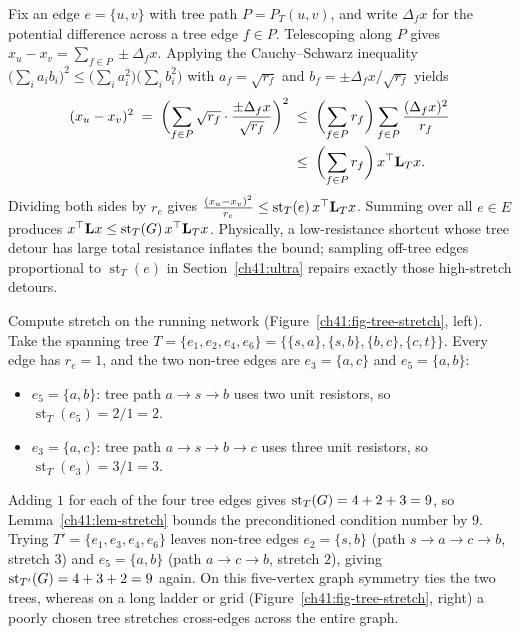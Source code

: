 \begin{whybox}
Fix an edge $e=\{u,v\}$ with tree path $P=P_T(u,v)$, and write $\Delta_f x$ for the potential difference across a tree edge $f \in P$. Telescoping along $P$ gives $x_u - x_v = \sum_{f \in P} \pm \Delta_f x$. Applying the Cauchy--Schwarz inequality $\bigl(\sum_i a_i b_i\bigr)^2 \le \bigl(\sum_i a_i^2\bigr)\bigl(\sum_i b_i^2\bigr)$ with $a_f = \sqrt{r_f}$ and $b_f = \pm \Delta_f x / \sqrt{r_f}$ yields
\begin{align*}
  (x_u-x_v)^2 \;=\; \biggl(\sum_{f\in P}\sqrt{r_f}\cdot\frac{\pm\Delta_f x}{\sqrt{r_f}}\biggr)^2
  &\;\le\; \biggl(\sum_{f\in P}r_f\biggr)\sum_{f\in P}\frac{(\Delta_f x)^2}{r_f} \\
  &\;\le\; \biggl(\sum_{f\in P}r_f\biggr)\,x^\top\mathbf{L}_T x .
\end{align*}
Dividing both sides by $r_e$ gives $\frac{(x_u-x_v)^2}{r_e}\le\operatorname{st}_T(e)\,x^\top\mathbf{L}_T x$. Summing over all $e \in E$ produces $x^\top\mathbf{L} x\le\operatorname{st}_T(G)\,x^\top\mathbf{L}_T x$. Physically, a low-resistance shortcut whose tree detour has large total resistance inflates the bound; sampling off-tree edges proportional to $\operatorname{st}_T(e)$ in Section~\ref{ch41:ultra} repairs exactly those high-stretch detours.
\end{whybox}

\begin{labbox}
Compute stretch on the running network (Figure~\ref{ch41:fig-tree-stretch}, left). Take the spanning tree $T=\{e_1,e_2,e_4,e_6\}=\{\{s,a\},\{s,b\},\{b,c\},\{c,t\}\}$. Every edge has $r_e = 1$, and the two non-tree edges are $e_3=\{a,c\}$ and $e_5=\{a,b\}$:
\begin{itemize}
  \item $e_5=\{a,b\}$: tree path $a\to s\to b$ uses two unit resistors, so $\operatorname{st}_T(e_5)=2/1=2$.
  \item $e_3=\{a,c\}$: tree path $a\to s\to b\to c$ uses three unit resistors, so $\operatorname{st}_T(e_3)=3/1=3$.
\end{itemize}
Adding $1$ for each of the four tree edges gives $\operatorname{st}_T(G)=4+2+3=9$, so Lemma~\ref{ch41:lem-stretch} bounds the preconditioned condition number by $9$. Trying $T'=\{e_1,e_3,e_4,e_6\}$ leaves non-tree edges $e_2=\{s,b\}$ (path $s\to a\to c\to b$, stretch $3$) and $e_5=\{a,b\}$ (path $a\to c\to b$, stretch $2$), giving $\operatorname{st}_{T'}(G)=4+3+2=9$ again. On this five-vertex graph symmetry ties the two trees, whereas on a long ladder or grid (Figure~\ref{ch41:fig-tree-stretch}, right) a poorly chosen tree stretches cross-edges across the entire graph.
\end{labbox}

